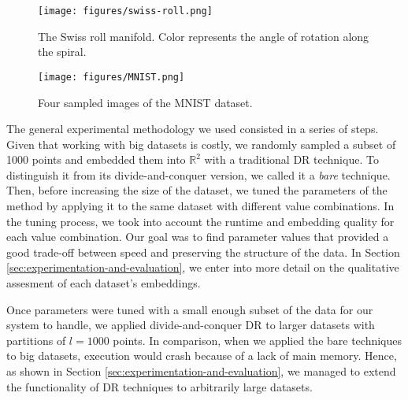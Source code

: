 \begin{figure}
    \centering
    \texttt{[image: figures/swiss-roll.png]}
    \caption{The Swiss roll manifold. Color represents the angle of rotation along the spiral.}
    \label{fig:swiss-roll}
\end{figure}

\begin{figure}
    \centering
    \texttt{[image: figures/MNIST.png]}
    \caption{Four sampled images of the MNIST dataset.}
    \label{fig:MNIST}
\end{figure}

The general experimental methodology we used consisted in a series of steps. Given that working with big datasets is costly, we randomly sampled a subset of 1000 points and embedded them into $\mathbb{R}^2$ with a traditional DR technique. To distinguish it from its divide-and-conquer version, we called it a \textit{bare} technique. Then, before increasing the size of the dataset, we tuned the parameters of the method by applying it to the same dataset with different value combinations. In the tuning process, we took into account the runtime and embedding quality for each value combination. Our goal was to find parameter values that provided a good trade-off between speed and preserving the structure of the data. In Section \ref{sec:experimentation-and-evaluation}, we enter into more detail on the qualitative assesment of each dataset's embeddings.

Once parameters were tuned with a small enough subset of the data for our system to handle, we applied divide-and-conquer DR to larger datasets with partitions of $l=1000$ points. In comparison, when we applied the bare techniques to big datasets, execution would crash because of a lack of main memory. Hence, as shown in Section \ref{sec:experimentation-and-evaluation}, we managed to extend the functionality of DR techniques to arbitrarily large datasets.